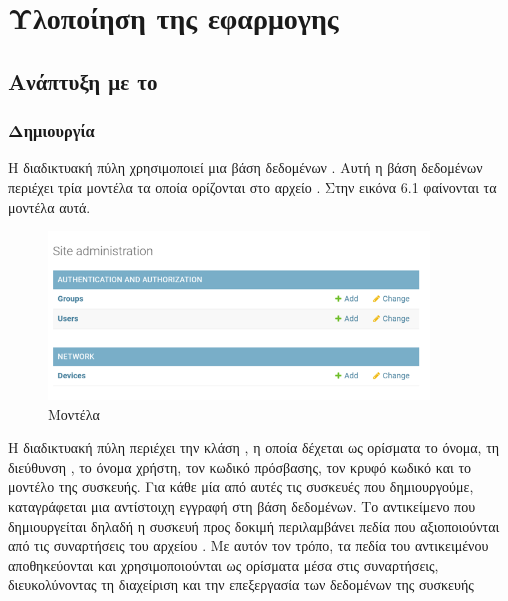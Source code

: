 \chapter{Υλοποίηση της εφαρμογης}

\section{Ανάπτυξη με το  }

\subsection{Δημιουργία }

Η διαδικτυακή πύλη χρησιμοποιεί μια βάση δεδομένων . Αυτή η βάση δεδομένων περιέχει τρία
μοντέλα τα οποία ορίζονται στο αρχείο . Στην εικόνα 6.1 φαίνονται τα μοντέλα αυτά.

\FloatBarrier

\begin{figure}[htb]
	\centering
	\includegraphics[width=0.9\textwidth]{graphics/models_2.png}
	\caption{Μοντέλα}
\end{figure}

\FloatBarrier


Η διαδικτυακή πύλη περιέχει την κλάση , η οποία δέχεται ως ορίσματα το όνομα, τη διεύθυνση , το όνομα χρήστη, τον κωδικό πρόσβασης, τον κρυφό κωδικό και το μοντέλο της συσκευής. Για κάθε μία από αυτές τις συσκευές που δημιουργούμε, καταγράφεται μια αντίστοιχη εγγραφή στη βάση δεδομένων. Το αντικείμενο που δημιουργείται δηλαδή η συσκευή προς δοκιμή περιλαμβάνει πεδία που αξιοποιούνται από τις συναρτήσεις του αρχείου . Με αυτόν τον τρόπο, τα πεδία του αντικειμένου αποθηκεύονται και χρησιμοποιούνται ως ορίσματα μέσα στις συναρτήσεις, διευκολύνοντας τη διαχείριση και την επεξεργασία των δεδομένων της συσκευής




